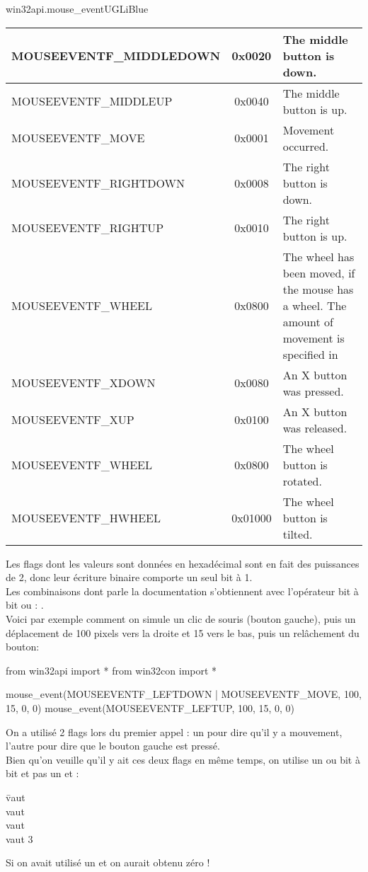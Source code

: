 \documentclass[a4paper,12pt,french]{book}
\begin{document}
\begin{encadrecolore}{win32api.mouse\_event}{UGLiBlue}
\begin{center}
\begin{tabular}{|>{\raggedright\arraybackslash}m{3.5cm}|c|>{\raggedright\arraybackslash}m{10.7cm}|}
		MOUSEEVENTF\_MIDDLEDOWN&
		0x0020&
		The middle button is down.\\\hline
		MOUSEEVENTF\_MIDDLEUP&
		0x0040&
		The middle button is up.\\\hline
		MOUSEEVENTF\_MOVE&
		0x0001&
		Movement occurred.\\\hline
		MOUSEEVENTF\_RIGHTDOWN&
		0x0008&
		The right button is down.\\\hline
		MOUSEEVENTF\_RIGHTUP&
		0x0010&
		The right button is up.\\\hline
		MOUSEEVENTF\_WHEEL&
		0x0800&
		The wheel has been moved, if the mouse has a wheel. The amount of movement is specified in \tw{dwData}\\\hline
		MOUSEEVENTF\_XDOWN&
		0x0080&
		An X button was pressed.\\\hline
		MOUSEEVENTF\_XUP&
		0x0100&
		An X button was released.\\\hline
		MOUSEEVENTF\_WHEEL&
		0x0800&
		The wheel button is rotated.\\\hline
		MOUSEEVENTF\_HWHEEL&
		0x01000&
		The wheel button is tilted.\\\hline
	\end{tabular}
\end{center}
\end{encadrecolore}
Les \og flags\fg{} dont les valeurs sont données en hexadécimal sont en fait des puissances de 2, donc leur écriture binaire comporte un seul bit à 1.\\
Les combinaisons dont parle la documentation s'obtiennent avec l'opérateur bit à bit \og ou\fg{} : \tw{|}.\\
Voici par exemple comment on simule un clic de souris (bouton gauche), puis un déplacement de 100 pixels vers la droite et 15 vers le bas, puis un relâchement du bouton:

\begin{pythoncode}
from win32api import *
from win32con import *

mouse_event(MOUSEEVENTF_LEFTDOWN | MOUSEEVENTF_MOVE, 100, 15, 0, 0)
mouse_event(MOUSEEVENTF_LEFTUP, 100, 15, 0, 0)

\end{pythoncode}

\begin{remarque}[]
	On a utilisé 2 flags lors du premier appel : un pour dire qu'il y a mouvement, l'autre pour dire que le bouton gauche est pressé.\\
	Bien qu'on veuille qu'il y ait ces deux flags en même temps, on utilise un \og ou\fg{} bit à bit et pas un \og et\fg{} :
	\begin{tabbing}
		 \= vaut \\
														\> vaut \\
														\> vaut \\
														\> vaut 3
	\end{tabbing}
	Si on avait utilisé un \og et \fg{}  on aurait obtenu zéro !
\end{remarque}
\end{document}

